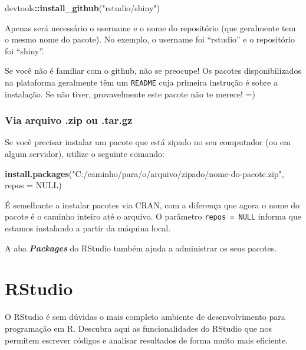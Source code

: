 \documentclass[
]{book}
\newenvironment{Shaded}{\begin{snugshade}}{\end{snugshade}}
\newcommand{\DataTypeTok}[1]{\textcolor[rgb]{0.13,0.29,0.53}{#1}}
\newcommand{\KeywordTok}[1]{\textcolor[rgb]{0.13,0.29,0.53}{\textbf{#1}}}
\newcommand{\NormalTok}[1]{#1}
\newcommand{\OperatorTok}[1]{\textcolor[rgb]{0.81,0.36,0.00}{\textbf{#1}}}
\newcommand{\OtherTok}[1]{\textcolor[rgb]{0.56,0.35,0.01}{#1}}
\newcommand{\StringTok}[1]{\textcolor[rgb]{0.31,0.60,0.02}{#1}}
\begin{document}
\begin{Shaded}
\begin{Highlighting}[]
\NormalTok{devtools}\OperatorTok{::}\KeywordTok{install_github}\NormalTok{(}\StringTok{"rstudio/shiny"}\NormalTok{)}
\end{Highlighting}
\end{Shaded}

Apenas será necessário o username e o nome do repositório (que geralmente tem o mesmo nome do pacote). No exemplo, o username foi ``rstudio'' e o repositório foi ``shiny''.

Se você não é familiar com o github, não se preocupe! Os pacotes disponibilizados na plataforma geralmente têm um \texttt{README} cuja primeira instrução é sobre a instalação. Se não tiver, provavelmente este pacote não te merece! =)

\hypertarget{via-arquivo-.zip-ou-.tar.gz}{%
\subsection{Via arquivo .zip ou .tar.gz}\label{via-arquivo-.zip-ou-.tar.gz}}

Se você precisar instalar um pacote que está zipado no seu computador (ou em algum servidor), utilize o seguinte comando:

\begin{Shaded}
\begin{Highlighting}[]
\KeywordTok{install.packages}\NormalTok{(}\StringTok{"C:/caminho/para/o/arquivo/zipado/nome-do-pacote.zip"}\NormalTok{, }\DataTypeTok{repos =} \OtherTok{NULL}\NormalTok{)}
\end{Highlighting}
\end{Shaded}

É semelhante a instalar pacotes via CRAN, com a diferença que agora o nome do pacote é o caminho inteiro até o arquivo. O parâmetro \texttt{repos\ =\ NULL} informa que estamos instalando a partir da máquina local.

A aba \textbf{\emph{Packages}} do RStudio também ajuda a administrar os seus pacotes.

\hypertarget{rstudio}{%
\chapter{RStudio}\label{rstudio}}

O RStudio é sem dúvidas o mais completo ambiente de desenvolvimento para programação em R. Descubra aqui as funcionalidades do RStudio que nos permitem escrever códigos e analisar resultados de forma muito mais eficiente.
\end{document}

